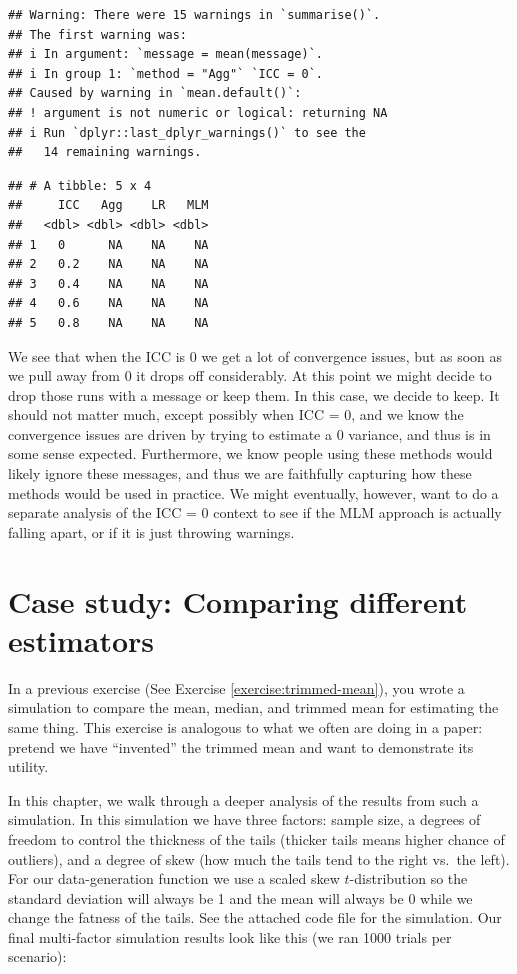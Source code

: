 \documentclass[
]{book}
\begin{document}
\begin{verbatim}
## Warning: There were 15 warnings in `summarise()`.
## The first warning was:
## i In argument: `message = mean(message)`.
## i In group 1: `method = "Agg"` `ICC = 0`.
## Caused by warning in `mean.default()`:
## ! argument is not numeric or logical: returning NA
## i Run `dplyr::last_dplyr_warnings()` to see the
##   14 remaining warnings.
\end{verbatim}

\begin{verbatim}
## # A tibble: 5 x 4
##     ICC   Agg    LR   MLM
##   <dbl> <dbl> <dbl> <dbl>
## 1   0      NA    NA    NA
## 2   0.2    NA    NA    NA
## 3   0.4    NA    NA    NA
## 4   0.6    NA    NA    NA
## 5   0.8    NA    NA    NA
\end{verbatim}

We see that when the ICC is 0 we get a lot of convergence issues, but as soon as we pull away from 0 it drops off considerably.
At this point we might decide to drop those runs with a message or keep them.
In this case, we decide to keep.
It should not matter much, except possibly when ICC = 0, and we know the convergence issues are driven by trying to estimate a 0 variance, and thus is in some sense expected.
Furthermore, we know people using these methods would likely ignore these messages, and thus we are faithfully capturing how these methods would be used in practice.
We might eventually, however, want to do a separate analysis of the ICC = 0 context to see if the MLM approach is actually falling apart, or if it is just throwing warnings.

\chapter{Case study: Comparing different estimators}\label{case-study-comparing-different-estimators}

In a previous exercise (See Exercise \ref{exercise:trimmed-mean}), you wrote a simulation to compare the mean, median, and trimmed mean for estimating the same thing.
This exercise is analogous to what we often are doing in a paper: pretend we have ``invented'' the trimmed mean and want to demonstrate its utility.

In this chapter, we walk through a deeper analysis of the results from such a simulation.
In this simulation we have three factors: sample size, a degrees of freedom to control the thickness of the tails (thicker tails means higher chance of outliers), and a degree of skew (how much the tails tend to the right vs.~the left).
For our data-generation function we use a scaled skew \(t\)-distribution so the standard deviation will always be 1 and the mean will always be 0 while we change the fatness of the tails.
See the attached code file for the simulation.
Our final multi-factor simulation results look like this (we ran 1000 trials per scenario):
\end{document}
